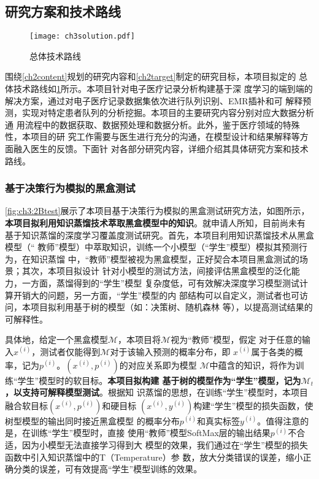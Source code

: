 \subsection{研究方案和技术路线}

\begin{figure}[h]
    \begin{small}
        \begin{center}
            \texttt{[image: ch3solution.pdf]}
        \end{center}
        \caption{总体技术路线}
        \label{fig:ch3:solution}
    \end{small}
\end{figure}

围绕\ref{ch2content}规划的研究内容和\ref{ch2target}制定的研究目标，本项目拟定的
总体技术路线如\cref{fig:ch3:solution}所示。本项目针对电子医疗记录分析构建基于深
度学习的端到端的解决方案，通过对电子医疗记录数据集依次进行队列识别、EMR插补和可
解释预测，实现对特定患者队列的分析挖掘。本项目的主要研究内容分别对应大数据分析通
用流程中的数据获取、数据预处理和数据分析。此外，鉴于医疗领域的特殊性，本项目的研
究工作需要与医生进行充分的沟通，在模型设计和结果解释等方面融入医生的反馈。下面针
对各部分研究内容，详细介绍其具体研究方案和技术路线。



\subsubsection{基于决策行为模拟的黑盒测试}\label{ch3_1}

\cref{fig:ch3:2Btest}展示了本项目基于决策行为模拟的黑盒测试研究方法，如图所示，
\textbf{本项目拟利用知识蒸馏技术萃取黑盒模型中的知识}。就申请人所知，目前尚未有
基于知识蒸馏的深度学习覆盖度测试研究。首先，本项目利用知识蒸馏技术从黑盒模型（``
教师''模型）中萃取知识，训练一个小模型（``学生''模型）模拟其预测行为，在知识蒸馏
中，``教师''模型被视为黑盒模型，正好契合本项目黑盒测试的场景；其次，本项目拟设计
针对小模型的测试方法，间接评估黑盒模型的泛化能力，一方面，蒸馏得到的``学生''模型
复杂度低，可有效解决深度学习模型测试计算开销大的问题，另一方面，``学生''模型的内
部结构可以自定义，测试者也可访问，本项目拟利用基于树的模型（如：决策树、随机森林
等），以提高测试结果的可解释性。

具体地，给定一个黑盒模型$\mathcal M$，本项目将$\mathcal M$视为``教师''模型，假定
对于任意的输入$x^{(i)}$，测试者仅能得到$\mathcal M$对于该输入预测的概率分布，即
$x^{(i)}$属于各类的概率，记为$p^{(i)}$。$(x^{(i)}, p^{(i)})$的对应关系即为模型
$\mathcal M$中蕴含的知识，将作为训练``学生''模型时的软目标。\textbf{本项目拟构建
基于树的模型作为``学生''模型，记为$\mathcal M_t$，以支持可解释模型测试}。根据知
识蒸馏的思想，在训练``学生''模型时，本项目融合软目标$(x^{(i)}, p^{(i)})$和硬目标
$(x^{(i)}, y^{(i)})$构建``学生''模型的损失函数，使树型模型的输出同时接近黑盒模型
的概率分布$p^{(i)}$和真实标签$y^{(i)}$。值得注意的是，在训练``学生''模型时，直接
使用``教师''模型SoftMax层的输出结果$p^{(i)}$不合适，因为小模型无法直接学习得到大
模型的效果，我们通过在``学生''模型的损失函数中引入知识蒸馏中的T（Temperature）参
数，放大分类错误的误差，缩小正确分类的误差，可有效提高``学生''模型训练的效果。

